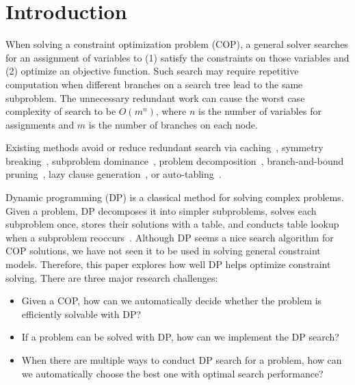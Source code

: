 \section{Introduction}
When solving a constraint optimization problem (COP), a general solver searches for an assignment of variables to (1) satisfy the constraints on those variables and (2) optimize an objective function. Such search may require repetitive computation when different branches on a search tree lead to the same subproblem. The unnecessary redundant work can cause the worst case complexity of search to be $O(m^n)$, where $n$ is the number of variables for assignments and $m$ is the number of branches on each node. 

Existing methods avoid or reduce redundant search via caching~\cite{Smith2005}, symmetry breaking~\cite{Gent2006}, subproblem dominance~\cite{chu2012exploiting}, problem  decomposition~\cite{kitching2007symmetric}, branch-and-bound pruning~\cite{marinescu2005and}, lazy clause generation~\cite{ohrimenko2009propagation}, or auto-tabling~\cite{dekker2017auto,zhou2015constraint}.

Dynamic programming (DP) is 
a classical method for solving complex problems. 
Given a problem, DP decomposes it into simpler subproblems, solves each subproblem once, stores their solutions with a table, and conducts table lookup when a subproblem reoccurs~\cite{Bertsekas:2000}. 
Although DP seems a nice search algorithm for COP solutions, we have not seen it to be used in solving general constraint models. 
Therefore, this paper explores how well DP helps optimize constraint solving. 
There are three major research challenges: 


\begin{itemize}
    \item Given a COP, how can we automatically decide whether the problem is efficiently solvable with DP? 
    \item If a problem can be solved with DP, how can we implement the DP search?
    \item When there are multiple ways to conduct DP search for a problem, how can we automatically choose the best one with optimal search performance? 
\end{itemize}

